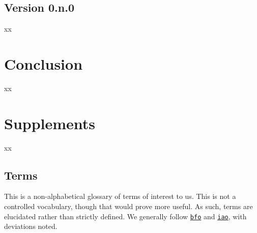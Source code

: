 \documentclass{amsart}%
\newcommand{\code}[1]{\texttt{#1}}%
\theoremstyle{plain}
\theoremstyle{definition}
\theoremstyle{remark}
\theoremstyle{definition}
\theoremstyle{remark}
\begin{document}
\subsection{Version 0.n.0}
\label{ss:ver0}
xx
%
%
%
%
%
\section{Conclusion}
\label{s:conc}
xx
%
%
%
%
%
%
\section*{Supplements}
\label{s:supp}
xx
%
%
%
%
\subsection{Terms}
\label{ss:terms}
This is a non-alphabetical glossary of terms of interest to us. This is not a controlled vocabulary, though that would prove more useful. As such, terms are elucidated rather than strictly defined. We generally follow \href{https://www.ebi.ac.uk/ols4/ontologies/bfo}{\code{bfo}} and \href{https://www.ebi.ac.uk/ols4/ontologies/iao}{\code{iao}}, with deviations noted.
%
%
%
%
%
\end{document}
